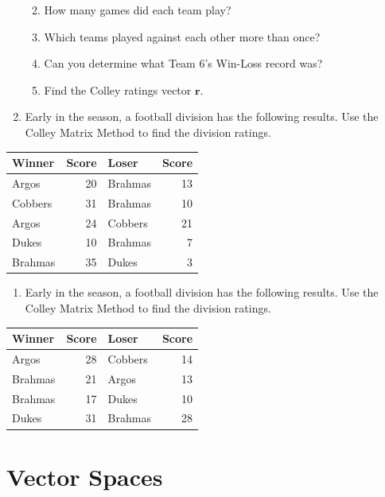 \documentclass[
]{book}
\providecommand{\tightlist}{%
  \setlength{\itemsep}{0pt}\setlength{\parskip}{0pt}}
\theoremstyle{definition}
\theoremstyle{definition}
\theoremstyle{definition}
\theoremstyle{definition}
\theoremstyle{remark}
\begin{document}
\begin{enumerate}
  \begin{enumerate}
  \def\labelenumii{\alph{enumii}.}
  \tightlist
  \item
    How many games did each team play?
  \item
    Which teams played against each other more than once?
  \item
    Can you determine what Team 6's Win-Loss record was?
  \item
    Find the Colley ratings vector \(\mathbf{r}\).
  \end{enumerate}
\item
  Early in the season, a football division has the following results. Use the Colley Matrix Method to find the division ratings.
\end{enumerate}

\begin{longtable}{lrlr}
\toprule
Winner & Score & Loser & Score\\
\midrule
Argos & 20 & Brahmas & 13\\
Cobbers & 31 & Brahmas & 10\\
Argos & 24 & Cobbers & 21\\
Dukes & 10 & Brahmas & 7\\
Brahmas & 35 & Dukes & 3\\
\bottomrule
\end{longtable}

\begin{enumerate}
\def\labelenumi{\arabic{enumi}.}
\setcounter{enumi}{39}
\tightlist
\item
  Early in the season, a football division has the following results. Use the Colley Matrix Method to find the division ratings.
\end{enumerate}

\begin{longtable}{lrlr}
\toprule
Winner & Score & Loser & Score\\
\midrule
Argos & 28 & Cobbers & 14\\
Brahmas & 21 & Argos & 13\\
Brahmas & 17 & Dukes & 10\\
Dukes & 31 & Brahmas & 28\\
\bottomrule
\end{longtable}

\chapter{Vector Spaces}\label{vector-spaces}
\end{document}
